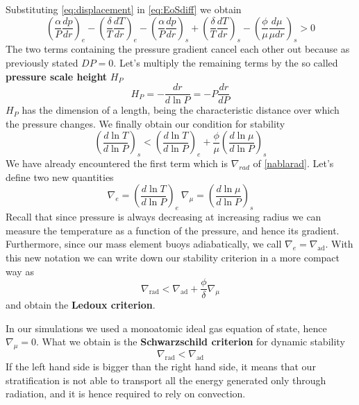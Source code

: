 Substituting \ref{eq:displacement} in \ref{eq:EoSdiff} we obtain
\begin{equation}
	\left (\frac{\alpha}{P} \frac{dp}{dr}\right )_e - \left ( \frac{\delta}{T}\frac{dT}{dr}\right )_e -  \left (\frac{\alpha}{P} \frac{dp}{dr}\right )_s +  \left ( \frac{\delta}{T}\frac{dT}{dr}\right )_s -  \left ( \frac{\phi}{\mu}\frac{d \mu}{\mu dr}\right )_s>0 
\end{equation}
The two terms containing the pressure gradient cancel each other out because as previously stated $DP=0$. Let's multiply the remaining terms by the so called \textbf{pressure scale height} $H_P$
\begin{equation}\label{scaleheight}
	H_P=-\frac{dr}{d \ln P}= - P \frac{dr}{dP}
\end{equation}
$H_P$ has the dimension of a length, being the characteristic distance over which the pressure changes.
We finally obtain our condition for stability
\begin{equation}\label{criterionstab}
	\left (   \frac{d \ln T}{d \ln P}    \right )_s <  \left (   \frac{d \ln T}{d \ln P}   \right )_e +  \frac{\phi}{\mu} \left (   \frac{d \ln \mu}{d \ln P}    \right )_s
\end{equation}
We have already encountered the first term which is $\nabla_{rad}$ of \ref{nablarad}.
Let's define two new quantities
\begin{equation}\label{nablas}
	\nabla_{e} = \left (  \frac{d \ln T}{d \ln P}   \right )_e \  \nabla_{\mu} = \left (  \frac{d \ln \mu}{d \ln P}   \right )_s
\end{equation}
Recall that since pressure is always decreasing at increasing radius we can measure the temperature as a function of the pressure, and hence its gradient. Furthermore, since our mass element buoys adiabatically, we call $\nabla_e=\nabla_{\mathrm{ad}}$. 
With this new notation we can write down our stability criterion in a more compact way as
\begin{equation}\label{stabcritcomp}
	\nabla_{\mathrm{rad}} < \nabla_{\mathrm{ad}} + \frac{\phi}{\delta} \nabla_{\mu}
\end{equation}
and obtain the \textbf{Ledoux criterion}. 

In our simulations we used a monoatomic ideal gas equation of state, hence $\nabla_{\mu}=0$.  What we obtain is the \textbf{Schwarzschild criterion} for dynamic stability
\begin{equation}\label{schwarzschild}
	\nabla_{\mathrm{rad}}<\nabla_{\mathrm{ad}}
\end{equation}
If the left hand side is bigger than the right hand side, it means that our stratification is not able to transport all the energy generated only through radiation, and it is hence required to rely on convection. 

